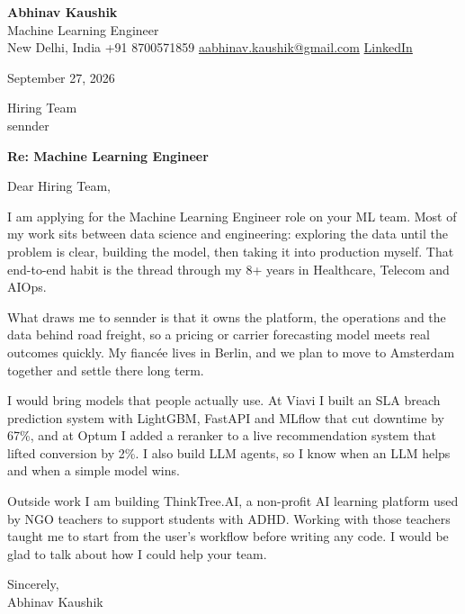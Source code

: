 \documentclass[11pt,a4paper]{article}
\begin{document}
{\Large\bfseries Abhinav Kaushik}\\
Machine Learning Engineer\\
New Delhi, India \textbar{} +91 8700571859 \textbar{} \href{mailto:aabhinav.kaushik@gmail.com}{aabhinav.kaushik@gmail.com} \textbar{} \href{https://www.linkedin.com/in/abhinav-kaushik10/}{LinkedIn}  

September 27, 2026

Hiring Team\\
sennder

\textbf{Re: Machine Learning Engineer}

Dear Hiring Team,

I am applying for the Machine Learning Engineer role on your ML team. Most of my work sits between data science and engineering: exploring the data until the problem is clear, building the model, then taking it into production myself. That end-to-end habit is the thread through my 8+ years in Healthcare, Telecom and AIOps.

What draws me to sennder is that it owns the platform, the operations and the data behind road freight, so a pricing or carrier forecasting model meets real outcomes quickly. My fiancée lives in Berlin, and we plan to move to Amsterdam together and settle there long term.

I would bring models that people actually use. At Viavi I built an SLA breach prediction system with LightGBM, FastAPI and MLflow that cut downtime by 67\%, and at Optum I added a reranker to a live recommendation system that lifted conversion by 2\%. I also build LLM agents, so I know when an LLM helps and when a simple model wins.

Outside work I am building ThinkTree.AI, a non-profit AI learning platform used by NGO teachers to support students with ADHD. Working with those teachers taught me to start from the user's workflow before writing any code. I would be glad to talk about how I could help your team.

Sincerely,\\[4pt]
Abhinav Kaushik
\end{document}
